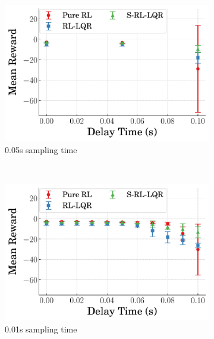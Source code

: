 \begin{figure}[tb]
  \centering
  \begin{subfigure}[b]{0.49\textwidth}
      \centering
      \includegraphics[width=\textwidth]{figures/figures_robustness/invpend_robustness/delay_reward_0.050_sampling.pdf}
      \caption{0.05\si{\second} sampling time}
      \label{subfig_chap4:invpend_reward_0.05}
  \end{subfigure}\\
  \hfill
  \begin{subfigure}[b]{0.49\textwidth}
      \centering
      \includegraphics[width=\textwidth]{figures/figures_robustness/invpend_robustness/delay_reward_0.010_sampling.pdf}
      \caption{0.01\si{\second} sampling time}
      \label{subfig_chap4:invpend_delay_reward_0.01}
  \end{subfigure}
  \hfill
  \begin{subfigure}[b]{0.49\textwidth}

\end{subfigure}
\end{figure}
